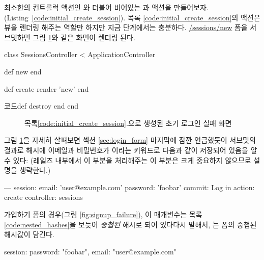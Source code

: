 최소한의 컨트롤럭 액션인 와 더불어 비어있는 과  액션을 만들어보자.(Listing~\ref{code:initial_create_session}). 목록 \ref{code:initial_create_session}의  액션은  뷰을 렌더링 해주는 역할만 하지만 지금 단계에서는 충분하다. \href{http://localhost:3000/sessions/new}{/sessions/new} 폼을 서브밋하면 그림 \ref{fig:initial_failed_login_rails_3}와 같은 화면이 렌더링 된다. 

\begin{codelisting} \label{code:initial_create_session}  

\begin{code} class SessionsController < ApplicationController 

def new end 

def create render 'new' end 

코드def destroy end end \end{code} \end{codelisting} 

\begin{figure} \begin{center}  \end{center} \caption{목록\ref{code:initial_create_session}.\label{fig:initial_failed_login_rails_3}으로 생성된 초기 로그인 실패 화면  } \end{figure} 

그림 \ref{fig:initial_failed_login_rails_3}을 자세히 살펴보면 섹션 \ref{sec:login_form} 마지막에  잠깐 언급했듯이 서브밋의 결과로  해시에 이메일과 비밀번호가 이라는 키워드로 다음과 같이 저장되어 있음을 알 수 있다: (레일즈 내부에서 이 부분을 처리해주는 이 부분은 크게 중요하지 않으므로 설명을 생략한다.) 

\begin{code} --- session: email: 'user@example.com' password: 'foobar' commit: Log in action: create controller: sessions \end{code} 

\noindent 가입하기 폼의 경우(그림 \ref{fig:signup_failure}), 이 매개변수는 목록\ref{code:nested_hashes}을 보듯이 \emph{중첩된} 해시로 되어 있다다시 말해서,  는 폼의 중첩된 해시값이 담긴다. 

\begin{code} { session: { password: "foobar", email: "user@example.com" } } \end{code} 

